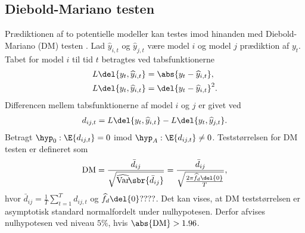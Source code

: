 \subsection{Diebold-Mariano testen}
Prædiktionen af to potentielle modeller kan testes imod hinanden med Diebold-Mariano (DM) testen \citep{dmtest}.
Lad \(\widehat{y}_{i,t}\) og \(\widehat{y}_{j,t}\) være model \(i\) og model \(j\) prædiktion af \(y_{t}\).
Tabet for model \(i\) til tid \(t\) betragtes ved tabsfunktionerne
\begin{align}
L \del{y_t, \widehat{y}_{i,t}} &= \abs{y_t - \widehat{y}_{i,t}}, \label{eq:lossMAE} \\
L \del{y_t, \widehat{y}_{i,t}} &= \del{y_t - \widehat{y}_{i,t}}^2. \label{eq:lossMSE}
\end{align}
Differencen mellem tabsfunktionerne af model \(i\) og \(j\) er givet ved 
\begin{align*}
d_{ij,t} = L \del{y_t, \widehat{y}_{i,t}} - L \del{y_t, \widehat{y}_{j,t}}.
\end{align*}
%
Betragt \(\hyp_0 : \E{d_{ij,t}} = 0\) imod \(\hyp_A: \E{d_{ij,t}} \neq 0\). Teststørrelsen for DM testen er defineret som
\begin{align*}
\text{DM} = \frac{\bar{d}_{ij}}{\sqrt{\widehat{\mathrm{Var}}\!\sbr{\bar{d}_{ij}}}} =  \frac{\bar{d}_{ij}}{\sqrt{\frac{ 2 \pi \widehat{f}_d \del{0}}{T}}},
\end{align*}
hvor \(\bar{d}_{ij} = \frac{1}{T} \sum_{t = 1}^T d_{ij,t}\) og \(\widehat{f}_d \del{0} ????\). 
%
Det kan vises, at DM teststørrelsen er asymptotisk standard normalfordelt under nulhypotesen. Derfor afvises nulhypotesen ved niveau $5 \%$, hvis $\abs{\text{DM}} > 1.96$.
